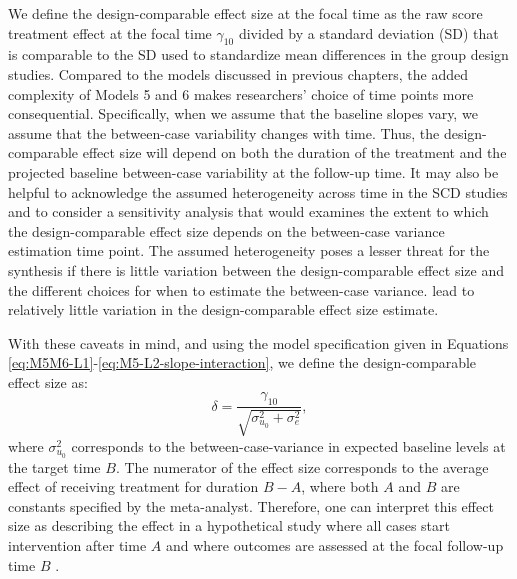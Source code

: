 \documentclass[
]{book}
\begin{document}
We define the design-comparable effect size at the focal time as the raw score treatment effect at the focal time \(\gamma_{10}\) divided by a standard deviation (SD) that is comparable to the SD used to standardize mean differences in the group design studies. Compared to the models discussed in previous chapters, the added complexity of Models 5 and 6 makes researchers' choice of time points more consequential. Specifically, when we assume that the baseline slopes vary, we assume that the between-case variability changes with time. Thus, the design-comparable effect size will depend on both the duration of the treatment and the projected baseline between-case variability at the follow-up time. It may also be helpful to acknowledge the assumed heterogeneity across time in the SCD studies and to consider a sensitivity analysis that would examines the extent to which the design-comparable effect size depends on the between-case variance estimation time point. The assumed heterogeneity poses a lesser threat for the synthesis if there is little variation between the design-comparable effect size and the different choices for when to estimate the between-case variance. lead to relatively little variation in the design-comparable effect size estimate.

With these caveats in mind, and using the model specification given in Equations \eqref{eq:M5M6-L1}-\eqref{eq:M5-L2-slope-interaction}, we define the design-comparable effect size as:
\begin{equation}
\label{eq:M5-SMD}
\delta = \frac{\gamma_{10}}{\sqrt{\sigma_{u_0}^2 + \sigma_e^2}},
\end{equation}
where \(\sigma_{u_0}^2\) corresponds to the between-case-variance in expected baseline levels at the target time \(B\). The numerator of the effect size corresponds to the average effect of receiving treatment for duration \(B-A\), where both \(A\) and \(B\) are constants specified by the meta-analyst. Therefore, one can interpret this effect size as describing the effect in a hypothetical study where all cases start intervention after time \(A\) and where outcomes are assessed at the focal follow-up time \(B\) \citep[see][ for more details on this interpretation]{Pustejovsky2014design}.
\end{document}
